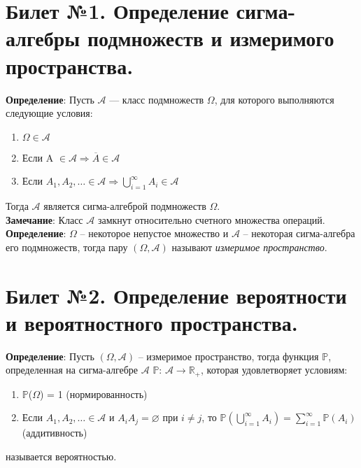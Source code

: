 

\usepackage{mathrsfs}        %
\usepackage{makecell}        %




\newpage
\tableofcontents{} %
\newpage
	
\section{Билет №1. Определение сигма-алгебры подмножеств и измеримого пространства.}

\hspace*{\parindent} \textbf{Определение}:  Пусть $\mathscr{A}$ — класс подмножеств $\Omega$, для которого выполняются следующие условия:
\begin{enumerate}
	\item $\Omega \in \mathscr{A}$
	\item Если A $\in \mathscr{A} \Rightarrow \overline{A} \in \mathscr{A}$
	\item Если $A_1, A_2, \ldots \in \mathscr{A} \Rightarrow  \bigcup\limits_{i = 1}^{\infty} {A_i} \in \mathscr{A}$ 
\end{enumerate}
Тогда $\mathscr{A}$ является сигма-алгеброй подмножеств $\Omega$.\\

\textbf{Замечание}: Класс $\mathscr{A}$ замкнут относительно счетного множества операций.\\

\textbf{Определение}: $\Omega$ -- некоторое непустое множество и $\mathscr{A}$ -- некоторая сигма-алгебра его подмножеств, тогда пару $(\Omega, \mathscr{A})$ называют \textit{измеримое пространство}.\\

\section{Билет №2. Определение вероятности и вероятностного пространства.}

\hspace*{\parindent} \textbf{Определение}: Пусть $(\Omega, \mathscr{A})$ -- измеримое пространство, тогда функция $\mathbb{P}$, определенная на сигма-алгебре $\mathscr{A}$ $\mathbb{P}$: $\mathscr{A} \longrightarrow \mathbb{R}_{+}$, которая удовлетворяет условиям:
\begin{enumerate}
	\item $\mathbb{P}$($\Omega$) = 1 (нормированность)
	\item Если $A_1, A_2, \ldots \in \mathscr{A}$ и $A_i A_j = \varnothing$ при $i\neq j$, то $\mathbb{P}(\bigcup\limits_{i = 1}^{\infty} {A_i}) =  \sum\limits_{i = 1}^{\infty} {\mathbb{P}(A_i)}$ (аддитивность)
\end{enumerate}
называется вероятностью.\\

